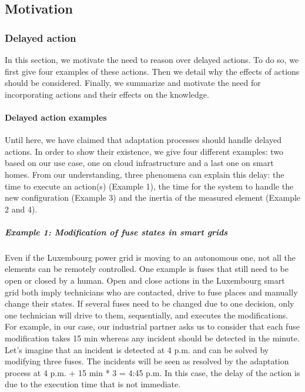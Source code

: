 \subsection{Motivation}

\subsubsection{Delayed action}

In this section, we motivate the need to reason over delayed actions.
To do so, we first give four examples of these actions.
Then we detail why the effects of actions should be considered.
Finally, we summarize and motivate the need for incorporating actions and their effects on the knowledge. 

\paragraph{Delayed action examples}
Until here, we have claimed that adaptation processes should handle delayed actions.
In order to show their existence, we give four different examples: two based on our use case, one on cloud infrastructure and a last one on smart homes.
From our understanding, three phenomena can explain this delay: the time to execute an action(s) (Example 1), the time for the system to handle the new configuration (Example 3) and the inertia of the measured element (Example 2 and 4).

\subparagraph{Example 1: Modification of fuse states in smart grids}
Even if the Luxembourg power grid is moving to an autonomous one, not all the elements can be remotely controlled.
One example is fuses that still need to be open or closed by a human.
Open and close actions in the Luxembourg smart grid both imply technicians who are contacted, drive to fuse places and manually change their states.
If several fuses need to be changed due to one decision, only one technician will drive to them, sequentially, and executes the modifications.
For example, in our case, our industrial partner asks us to consider that each fuse modification takes 15 min whereas any incident should be detected in the minute.
Let's imagine that an incident is detected at 4 p.m. and can be solved by modifying three fuses.
The incidents will be seen as resolved by the adaptation process at 4 p.m. + 15 min * 3 = 4:45 p.m.
In this case, the delay of the action is due to the execution time that is not immediate.

